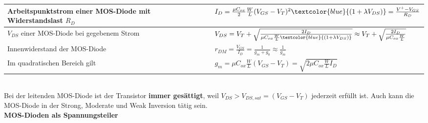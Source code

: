 \begin{tabular}{|l|l|}
    \hline
    Arbeitspunktstrom einer MOS-Diode mit Widerstandslast $R_D$ & $I_D = \frac{\mu C_{ox}}{2}\frac{W}{L}(V_{GS}-V_T)^2\textcolor{blue}{(1+\lambda V_{DS})}= \frac{V^+-V_{GS}}{R_D}$ \\
    \hline
    $V_{DS}$ einer MOS-Diode bei gegebenem Strom                & $V_{DS} = V_T + \sqrt{\frac{2 I_D}{\mu C_{ox}\frac{W}{L} \textcolor{blue}{(1+\lambda V_{DS})}}}\approx V_T + \sqrt{\frac{2 I_D}{\mu C_{ox}\frac{W}{L}}}$ \\
    \hline
    Innenwiderstand der MOS-Diode                               & $r_{DM} = \frac{V_{GS}}{I_D} = \frac{1}{g_m+g_0} \approx \frac{1}{g_m}$ \\
    \hline
    Im quadratischen Bereich gilt                               & $g_m = \mu C_{ox}\frac{W}{L} (V_{GS}-V_T) = \sqrt{2\mu C_{ox}\frac{W}{L} I_D}$ \\
    \hline
\end{tabular}\vspace{5pt}\\
Bei der leitenden MOS-Diode ist der Transistor \textbf{immer gesättigt}, weil $V_{DS}>V_{DS,sat} = (V_{GS}-V_T)$ jederzeit erfüllt ist. Auch kann die MOS-Diode in der Strong, Moderate und Weak Inversion tätig sein. \\
\textbf{MOS-Dioden als Spannungsteiler}\\
\renewcommand{\arraystretch}{1}
